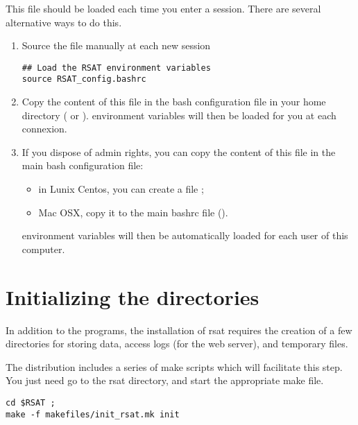 \documentclass[12pt,a4paper, oneside]{scrreprt} %
\begin{document}
This file should be loaded each time you enter a session. There are
several alternative ways to do this.

\begin{enumerate}

\item Source the file manually at each new session

\begin{lstlisting}
## Load the RSAT environment variables
source RSAT_config.bashrc
\end{lstlisting}

\item Copy the content of this file in the bash configuration file in
  your home directory ( or
  ). \RSAT environment variables will then be
  loaded for you at each connexion.

\item If you dispose of admin rights, you can copy the content of this
  file in the main bash configuration file: 
  \begin {itemize}
  \item in Lunix Centos, you can create a file
    ; 
  \item Mac OSX, copy it to the main bashrc file ().
  \end{itemize}
  \RSAT environment variables will then be automatically loaded for
  each user of this computer.
\end{enumerate}



\section{Initializing the directories}

In addition to the programs, the installation of rsat requires
the creation of a few directories for storing data, access logs (for
the web server), and temporary files.

The distribution includes a series of make scripts which will
facilitate this step. You just need go to the rsat directory, and
start the appropriate make file.

\begin{lstlisting}
cd $RSAT ; 
make -f makefiles/init_rsat.mk init
\end{lstlisting}

\end{document}
